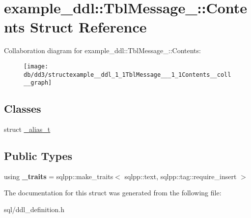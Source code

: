 \hypertarget{structexample__ddl_1_1TblMessage___1_1Contents}{}\section{example\+\_\+ddl\+:\+:Tbl\+Message\+\_\+\+:\+:Contents Struct Reference}
\label{structexample__ddl_1_1TblMessage___1_1Contents}


Collaboration diagram for example\+\_\+ddl\+:\+:Tbl\+Message\+\_\+\+:\+:Contents\+:
\nopagebreak
\begin{figure}[H]
\begin{center}
\leavevmode
\texttt{[image: db/dd3/structexample\_\_ddl\_1\_1TblMessage\_\_\_1\_1Contents\_\_coll\_\_graph]}
\end{center}
\end{figure}
\subsection*{Classes}
\begin{DoxyCompactItemize}
\item 
struct \hyperlink{structexample__ddl_1_1TblMessage___1_1Contents_1_1__alias__t}{\+\_\+alias\+\_\+t}
\end{DoxyCompactItemize}
\subsection*{Public Types}
\begin{DoxyCompactItemize}
\item 
\hypertarget{structexample__ddl_1_1TblMessage___1_1Contents_a935ebbc223015788faedd9370e2ceea8}{}using {\bfseries \+\_\+traits} = sqlpp\+::make\+\_\+traits$<$ sqlpp\+::text, sqlpp\+::tag\+::require\+\_\+insert $>$\label{structexample__ddl_1_1TblMessage___1_1Contents_a935ebbc223015788faedd9370e2ceea8}

\end{DoxyCompactItemize}


The documentation for this struct was generated from the following file\+:\begin{DoxyCompactItemize}
\item 
sql/ddl\+\_\+definition.\+h\end{DoxyCompactItemize}
